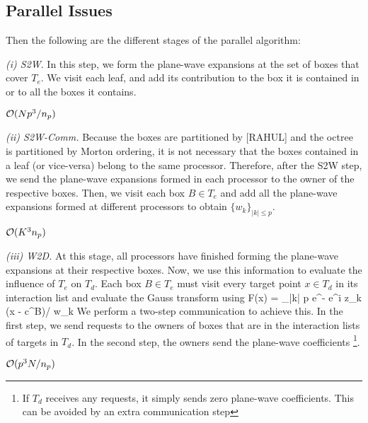 \subsection{Parallel Issues}

Then the following are the different stages of the parallel algorithm:

{\em (i) S2W}. In this step, we form the plane-wave expansions at the set of boxes that cover $T_e$. 
We visit each leaf, and add its contribution to the box it is contained in or to all the boxes it contains. 

\hfill $\mathcal{O}(N p^3/n_p)$

{\em (ii) S2W-Comm.} Because the boxes are partitioned by [RAHUL] and the octree is partitioned by Morton ordering, it is not necessary that the boxes contained in a leaf (or vice-versa) belong to the same processor. Therefore, after the S2W step, we send the plane-wave expansions formed in each processor to the owner of the respective boxes. Then, we visit each box $B \in T_e$ and add all the plane-wave expansions formed at different processors to obtain $\{w_k \}_{|k| \leq p}$.  

\hfill $\mathcal{O}(K^3 n_p)$

{\em (iii) W2D.} At this stage, all processors have finished forming the plane-wave expansions at their respective boxes. 
Now, we use this information to evaluate the influence of $T_e$ on $T_d$. Each box $B \in T_e$ must visit every target point $x \in T_d$ in its interaction list and evaluate the Gauss transform using
%
\beq F(x) = \sum_{|k| \leq p} e^{-} e^{i z_k \cdot (x - c^B)/\sqrt{\delta}} w_k \eeq
%
We perform a two-step communication to achieve this. In the first step, we send requests to the owners of boxes that are in the interaction lists of targets in $T_d$. In the second step, the owners send the plane-wave coefficients \footnote{ If $T_d$ receives any requests, it simply sends zero plane-wave coefficients. This can be avoided by an extra communication step}. 

\hfill $\mathcal{O}(p^3 N / n_p)$

